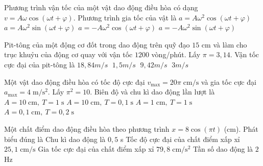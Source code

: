 \begin{ex}
	Phương trình vận tốc của một vật dao động điều hòa có dạng $v=A\omega\cos(\omega t+\varphi)$. Phương trình gia tốc của vật là
	\choice
	{$a=A\omega^2\cos(\omega t+\varphi)$}
	{$a=A\omega^2\sin(\omega t+\varphi)$}
	{$a=-A\omega^2\cos(\omega t+\varphi)$}
	{\True $a=-A\omega^2\sin(\omega t+\varphi)$}
\end{ex}


\begin{ex}
	Pit-tông của một động cơ đốt trong dao động trên quỹ đạo $\text{15 cm}$ và làm cho trục khuỷu của động cơ quay với vận tốc $1200$ vòng/phút. Lấy $\pi =3,14.$ Vận tốc cực đại của pit-tông là
	\choice
	{$18,84{m}/{s}\;$}
	{$1,5{m}/{s}\;$}
	{\True $9,42{m}/{s}\;$}
	{$3{m}/{s}\;$}
\end{ex}

\begin{ex}
	Một vật dao động điều hòa có tốc độ cực đại $v_{\max}=20\pi\;\mathrm{cm/s}$ và gia tốc cực đại $a_{\max}=4\;\mathrm{m/s^2}$. Lấy $\pi^2=10$. Biên độ và chu kì dao động lần lượt là
	\choice
	{\True $A=10\;\mathrm{cm},\ T=1\;\mathrm{s}$}
	{$A=10\;\mathrm{cm},\ T=0{,}1\;\mathrm{s}$}
	{$A=1\;\mathrm{cm},\ T=1\;\mathrm{s}$}
	{$A=0{,}1\;\mathrm{cm},\ T=0{,}2\;\mathrm{s}$}
\end{ex}

\begin{ex}
	Một chất điểm dao động điều hòa theo phương trình $x=8\cos(\pi t)$ (cm). Phát biểu đúng là
	\choice
	{Chu kì dao động là $0{,}5$ s}
	{\True Tốc độ cực đại của chất điểm xấp xỉ $25{,}1\;\mathrm{cm/s}$}
	{Gia tốc cực đại của chất điểm xấp xỉ $79{,}8\;\mathrm{cm/s^2}$}
	{Tần số dao động là $2$ Hz}
\end{ex}

